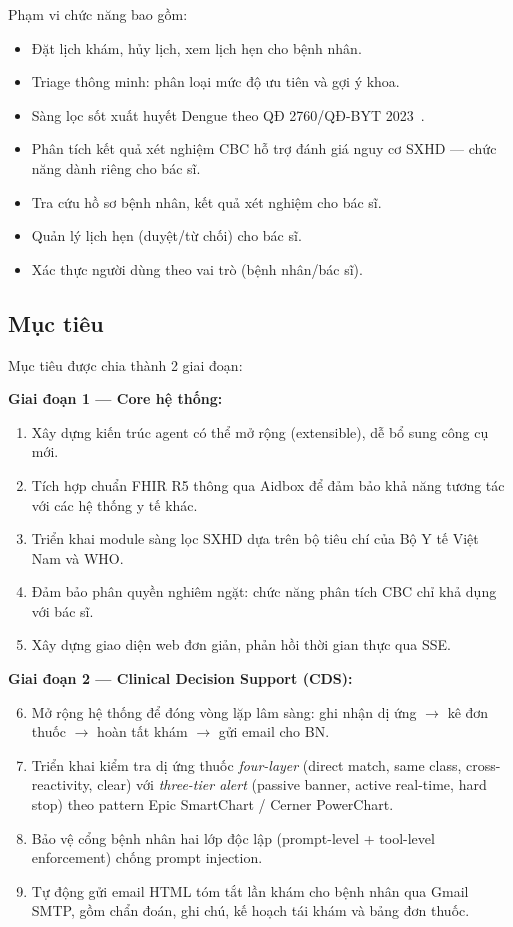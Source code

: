 \documentclass[a4paper,13pt,3p,twoside,openany]{report}
\theoremstyle{definition}
\theoremstyle{remark}
\theoremstyle{definition}
\let\ORIGsubsection\subsection
\renewcommand{\subsection}{\needspace{3\baselineskip}\ORIGsubsection}
\begin{document}
Phạm vi chức năng bao gồm:
\begin{itemize}
  \item Đặt lịch khám, hủy lịch, xem lịch hẹn cho bệnh nhân.
  \item Triage thông minh: phân loại mức độ ưu tiên và gợi ý khoa.
  \item Sàng lọc sốt xuất huyết Dengue theo QĐ 2760/QĐ-BYT 2023~\cite{qd2760}.
  \item Phân tích kết quả xét nghiệm CBC hỗ trợ đánh giá nguy cơ SXHD --- chức năng dành riêng cho bác sĩ.
  \item Tra cứu hồ sơ bệnh nhân, kết quả xét nghiệm cho bác sĩ.
  \item Quản lý lịch hẹn (duyệt/từ chối) cho bác sĩ.
  \item Xác thực người dùng theo vai trò (bệnh nhân/bác sĩ).
\end{itemize}

\subsection{Mục tiêu}

Mục tiêu được chia thành 2 giai đoạn:

\textbf{Giai đoạn 1 --- Core hệ thống:}
\begin{enumerate}
  \item Xây dựng kiến trúc agent có thể mở rộng (extensible), dễ bổ sung công cụ mới.
  \item Tích hợp chuẩn FHIR R5 thông qua Aidbox để đảm bảo khả năng tương tác với các hệ thống y tế khác.
  \item Triển khai module sàng lọc SXHD dựa trên bộ tiêu chí của Bộ Y tế Việt Nam và WHO.
  \item Đảm bảo phân quyền nghiêm ngặt: chức năng phân tích CBC chỉ khả dụng với bác sĩ.
  \item Xây dựng giao diện web đơn giản, phản hồi thời gian thực qua SSE.
\end{enumerate}

\textbf{Giai đoạn 2 --- Clinical Decision Support (CDS):}
\begin{enumerate}\setcounter{enumi}{5}
  \item Mở rộng hệ thống để đóng vòng lặp lâm sàng: ghi nhận dị ứng $\to$ kê đơn thuốc $\to$ hoàn tất khám $\to$ gửi email cho BN.
  \item Triển khai kiểm tra dị ứng thuốc \textit{four-layer} (direct match, same class, cross-reactivity, clear) với \textit{three-tier alert} (passive banner, active real-time, hard stop) theo pattern Epic SmartChart / Cerner PowerChart.
  \item Bảo vệ cổng bệnh nhân hai lớp độc lập (prompt-level + tool-level enforcement) chống prompt injection.
  \item Tự động gửi email HTML tóm tắt lần khám cho bệnh nhân qua Gmail SMTP, gồm chẩn đoán, ghi chú, kế hoạch tái khám và bảng đơn thuốc.
\end{enumerate}
\end{document}
